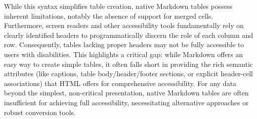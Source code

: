 While this syntax simplifies table creation, native Markdown tables possess inherent limitations, notably the absence of support for merged cells.\cite{DocsToMarkdown} Furthermore, screen readers and other accessibility tools fundamentally rely on clearly identified headers to programmatically discern the role of each column and row.\cite{DocsToMarkdown} Consequently, tables lacking proper headers may not be fully accessible to users with disabilities.\cite{DocsToMarkdown} This highlights a critical gap: while Markdown offers an easy way to create simple tables, it often falls short in providing the rich semantic attributes (like captions, table body/header/footer sections, or explicit header-cell associations) that HTML offers for comprehensive accessibility. For any data beyond the simplest, non-critical presentation, native Markdown tables are often insufficient for achieving full accessibility, necessitating alternative approaches or robust conversion tools.

